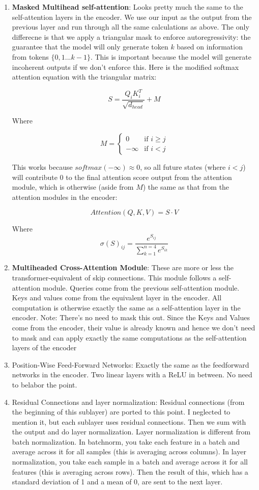 \documentclass[12pt]{article}
\begin{document}
\begin{enumerate}
\item \textbf{Masked Multihead self-attention}: Looks pretty much the same to the self-attention layers in the encoder. We use our input as the output from the previous layer and run through all the same calculations as above. The only differecne is that we apply a triangular mask to enforce autoregressivity: the guarantee that the model will only generate token \(k\) based on information from tokens \(\{0, 1 ... k-1\}\). This is important because the model will generate incoherent outputs if we don't enforce this. Here is the modified softmax attention equation with the triangular matrix:

\[S  =  \frac{Q_i K_i^T}{\sqrt{d_{head}}} + M\]

Where

\[
M = 
\begin{cases} 
0& \text{if } i \geq j \\
-\infty & \text{if } i < j
\end{cases}
\]

This works because \(softmax(-\infty) \approx 0\), so all future states (where \(i < j\)) will contribute 0 to the final attention score output from the attention module, which is otherwise (aside from \(M\)) the same as that from the attention modules in the encoder: 

\[Attention(Q,K,V) = S \cdot V\]

Where 
\[\sigma(S)_{ij} = \frac{e^{S_{ij}}}{\sum_{k=1}^{n=4}e^{S_{ik}}}\]
\item{\textbf{Multiheaded Cross-Attention Module}}: These are more or less the transformer-equivalent of skip connections. This module follows a self-attention module. Queries come from the previous self-attention module. Keys and values come from the equivalent layer in the encoder. All computation is otherwise exactly the same as a self-attention layer in the encoder. Note: There's no need to mask this out. Since the Keys and Values come from the encoder, their value is already known and hence we don't need to mask and can apply exactly the same computations as the self-attention layers of the encoder
\item{Position-Wise Feed-Forward Networks}: Exactly the same as the feedforward networks in the encoder. Two linear layers with a ReLU in between. No need to belabor the point. 
\item{Residual Connections and layer normalization}: Residual connections (from the beginning of this sublayer) are ported to this point. I neglected to mention it, but each sublayer uses residual connections. Then we sum with the output and do layer normalization. Layer normalization is different from batch normalization. In batchnorm, you take each feature in a batch and average across it for all samples (this is averaging across columns). In layer normalization, you take each sample in a batch and average across it for all features (this is averaging across rows). Then the result of this, which has a standard deviation of 1 and a mean of 0, are sent to the next layer.
\end{enumerate}
\end{document}
